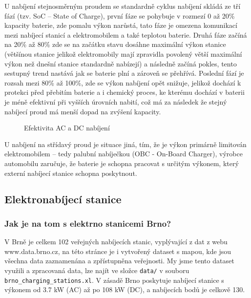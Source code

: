 \documentclass[a4paper,11pt]{article}
\begin{document}
U nabíjení stejnosměrným proudem se standardně cyklus nabíjení skládá ze tří fází (tzv. SoC -- State of Charge), první
fáze se pohybuje v rozmezí 0 až 20\% kapacity baterie, zde pomalu výkon narůstá, tato fáze je omezena komunikací
mezi nabíjecí stanicí a elektromobilem a také teplotou baterie. Druhá fáze začíná na 20\% až 80\% zde se na začátku
stavu dosáhne maximální výkon stanice (většínou stanice jelikož elektromobily mají zpravidla povolený větší maximální výkon
než dnešní stanice standardně nabízejí) a následně začíná pokles, tento sestupný trend nastává jak se baterie plní a
zároveň se přehřívá. Poslední fází je rozsah mezi 80\% až 100\%, zde se výkon nabíjení opět snižuje, jelikož
dochází k protekci před přebitím baterie a i chemický proces, ke kterému dochází v baterii je méně efektivní 
při vyšších úrovních nabití, což má za následek že stejný nabíjecí proud má menší dopad na zvýšení kapacity.\cite{nabijeci_krivka}

\begin{figure}[H]
    \centering
    \caption{Efektivita AC a DC nabíjení \cite{rozdil_mezi_ac_dc_nabijenim_graf}}
    \label{figure:ac-dc-charging-efficency}
\end{figure}

U nabíjení na střídavý proud je situace jiná, tím, že je výkon primárně limitován elektromobilem -- tedy palubní nabíječkou 
(OBC - On-Board Charger), výrobce automobilu zaručuje, že baterie je schopna pracovat s určitým výkonem, který externí
nabíjecí stanice schopna poskytnout. %

\subsection{Elektronabíjecí stanice}

\subsubsection{Jak je na tom s elektrno stanicemi Brno?}
V Brně je celkem 102 veřejných nabíjecích stanic, vyplývající z dat z webu www.data.brno.cz\cite{data_brno},
na této stránce je i vytvořený dataset s mapou, kde jsou všechna data zaznamenána a zpřístupněna veřejnosti.
My jsme tento dataset využili a zpracovaná data, lze najít ve složce \texttt{data/} v souboru \texttt{brno\_charging\_stations.xl}.
V zásadě Brno poskytuje nabíjecí stanice s výkonem od 3.7 kW (AC) až po 108 kW (DC), a nabíjecích bodů je 
celkově 130.
\end{document}
